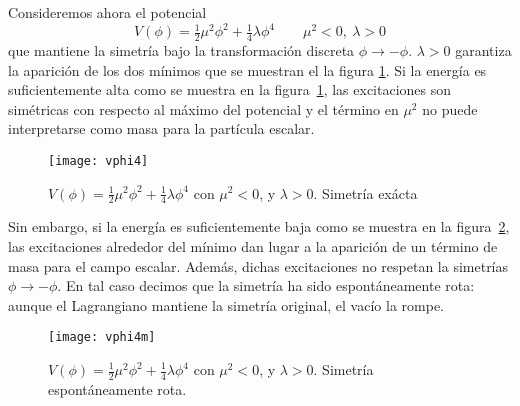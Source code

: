 \begin{frame}
Consideremos ahora el potencial
\begin{equation}
  V(\phi)=\tfrac{1}{2}\mu^2\phi^2+\tfrac{1}{4}\lambda\phi^4
  \qquad   \mu^2\lt 0,\ \lambda\gt 0
\end{equation}
que mantiene la simetría bajo la transformación discreta $\phi\to-\phi$. $\lambda\gt 0$ garantiza la aparición de los dos mínimos que se muestran el la figura \ref{fig:x2l}. Si la energía es suficientemente alta como se muestra en la figura~\ref{fig:x2l}, las excitaciones son simétricas con respecto al máximo del potencial y el término en $\mu^2$ no puede interpretarse como masa para la partícula escalar. 
\end{frame}
\begin{frame}
\begin{figure} %
  \centering %
  \texttt{[image: vphi4]}
  \caption{$V(\phi)=\frac{1}{2}\mu^2 \phi^2+\frac{1}{4}\lambda\phi^4$ con $\mu^2\lt 0$, y $\lambda\gt 0$. Simetría exácta} %
  \label{fig:x2l} %
\end{figure} 
\end{frame}
Sin embargo, si la energía es suficientemente baja como se muestra en la figura~\ref{fig:x2lm}, las excitaciones alrededor del mínimo dan lugar a la aparición de un término de masa para el campo escalar. Además, dichas excitaciones no respetan la simetrías $\phi\to-\phi$. En tal caso decimos que la simetría ha sido espontáneamente rota: aunque el Lagrangiano mantiene la simetría original, el vacío la rompe. 
\begin{frame}

\begin{figure} %
  \centering %
  \texttt{[image: vphi4m]}
  \caption{$V(\phi)=\frac{1}{2}\mu^2 \phi^2+\frac{1}{4}\lambda\phi^4$ con $\mu^2\lt 0$, y $\lambda\gt 0$. Simetría espontáneamente rota.} %
  \label{fig:x2lm} %
\end{figure}  %
\end{frame}

